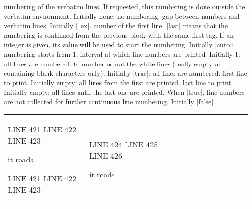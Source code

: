 \documentclass{article}
\def\CDRCheckRed {}
\begin{document}
\begin{description}
\itemtt[\CDRCheckRed numbers=none|left|right]
numbering of the verbatim lines.
If requested, this numbering is done outside the verbatim environment.
Initially none: no numbering.
\itemtt[\CDRCheckRed numbersep=\CDRMeta{dimension}]
gap between numbers and verbatim lines.
Initially \CDRCode|1ex|.
\itemtt[\CDRCheckRed firstnumber=auto|last|\CDRMeta{integer}]
number of the first line.
\CDRCode|last| means that the numbering is continued from the previous  block with the same first tag.
If an integer is given, its value will be used to start the numbering.
Initially \CDRCode|auto|: numbering starts from 1.
\itemtt[\CDRCheckRed step number=\CDRMeta{integer}]
interval at which line numbers are printed.
Initially 1: all lines are numbered.
\itemtt[\CDRCheckRed numberblanklines{[=true|false]}]
to number or not the white lines (really empty or containing blank characters only).
Initially |true|: all lines are numbered.
\itemtt[\CDRCheckRed firstline=\CDRMeta{integer}|\CDRMeta{regex}]
first line to print.
Initially empty: all lines from the first are printed.
\itemtt[\CDRCheckRed lastline=\CDRMeta{integer}|\CDRMeta{regex}]
last line to print.
Initially empty: all lines until the last one are printed.
\itemtt[\CDRCheckRed dry numbers{[=true|false]}]
When \CDRCode|true|, line numbers are not collected for further continuous line numbering.
Initially \CDRCode|false|.
\begin{center}
\setlength{\tabcolsep}{0mm}
\begin{tabular}{p{0.333\linewidth}p{0.333\linewidth}p{0.333\linewidth}}
\begin{CDRBlock}[tags=src,no top space]
\begin{⟨CDRBlock⟩}[
  firstnumber=421,
  
]
LINE 421
LINE 422
LINE 423
\end{⟨CDRBlock⟩}
\end{CDRBlock}
it reads
\begin{CDRBlock}[
  numbers=left,
  firstnumber=421,
]
LINE 421
LINE 422
LINE 423
\end{CDRBlock}
&
\begin{CDRBlock}[tags=src,no top space]
\begin{⟨CDRBlock⟩}[
  firstnumber=last,
  dry numbers,
]
LINE 424
LINE 425
LINE 426
\end{⟨CDRBlock⟩}
\end{CDRBlock}
it reads
\begin{CDRBlock}[
  numbers=left,
  firstnumber=last,
  dry numbers,
]

\end{CDRBlock}
\end{tabular}
\end{center}
\end{description}
\end{document}
